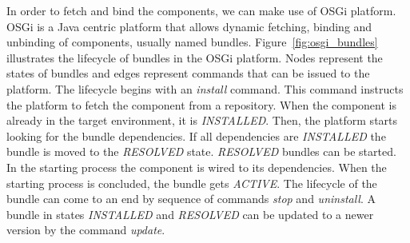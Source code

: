 In order to fetch and bind the components, we can make use of OSGi platform\cite{the_osgi_alliance_osgi_2007}. OSGi is a Java centric platform that allows dynamic fetching, binding and unbinding of components, usually named bundles.
Figure~\ref{fig:osgi_bundles} illustrates the lifecycle of bundles in the OSGi platform\cite{the_osgi_alliance_osgi_2007}. Nodes represent the states of bundles and edges represent commands that can be issued to the platform.
The lifecycle begins with an \emph{install} command. This command instructs the platform to fetch the component from a repository. When the component is already in the target environment, it is \emph{INSTALLED}. Then, the platform starts looking for the bundle dependencies. If all dependencies are \emph{INSTALLED} the bundle is moved to the \emph{RESOLVED} state. \emph{RESOLVED} bundles can be started. In the starting process the component is wired to its dependencies. When the starting process is concluded, the bundle gets \emph{ACTIVE}. The lifecycle of the bundle can come to an end by sequence of commands \emph{stop} and \emph{uninstall}. A bundle in states \emph{INSTALLED} and \emph{RESOLVED} can be updated to a newer version by the command \emph{update}.
